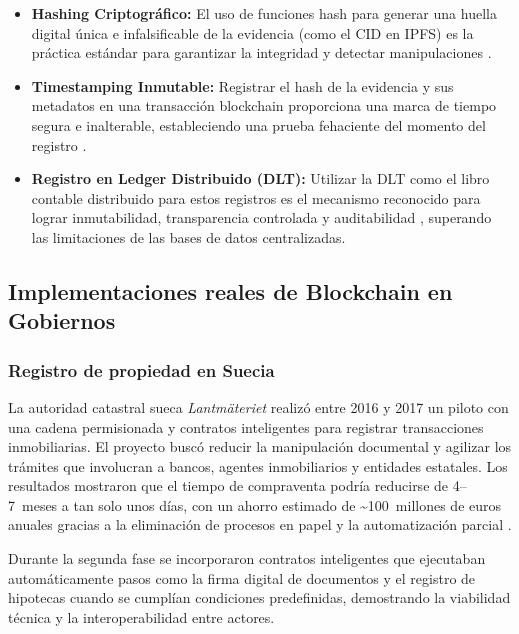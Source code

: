 \begin{itemize}
    \item \textbf{Hashing Criptográfico:} El uso de funciones hash para generar una huella digital única e infalsificable de la evidencia (como el CID en IPFS) es la práctica estándar para garantizar la integridad y detectar manipulaciones \parencite{benet2014ipfs}. 
    \item \textbf{Timestamping Inmutable:} Registrar el hash de la evidencia y sus metadatos en una transacción blockchain proporciona una marca de tiempo segura e inalterable, estableciendo una prueba fehaciente del momento del registro \parencite{nakamoto2008bitcoin}. 
    \item \textbf{Registro en Ledger Distribuido (DLT):} Utilizar la DLT como el libro contable distribuido para estos registros es el mecanismo reconocido para lograr inmutabilidad, transparencia controlada y auditabilidad \parencite{swan2015blockchain}, superando las limitaciones de las bases de datos centralizadas.
\end{itemize}

\subsection{Implementaciones reales de Blockchain en Gobiernos}

\subsubsection{Registro de propiedad en Suecia}

La autoridad catastral sueca \textit{Lantmäteriet} realizó entre 2016 y 2017 un piloto con una cadena permisionada y contratos inteligentes para registrar transacciones inmobiliarias. El proyecto buscó reducir la manipulación documental y agilizar los trámites que involucran a bancos, agentes inmobiliarios y entidades estatales. Los resultados mostraron que el tiempo de compraventa podría reducirse de 4--7~meses a tan solo unos días, con un ahorro estimado de \textasciitilde{}100~millones de euros anuales gracias a la eliminación de procesos en papel y la automatización parcial \parencite{lantmateriet2017,lantmateriet_cointelegraph2017,lantmateriet_cointelegraph2_2017}.

Durante la segunda fase se incorporaron contratos inteligentes que ejecutaban automáticamente pasos como la firma digital de documentos y el registro de hipotecas cuando se cumplían condiciones predefinidas, demostrando la viabilidad técnica y la interoperabilidad entre actores.

